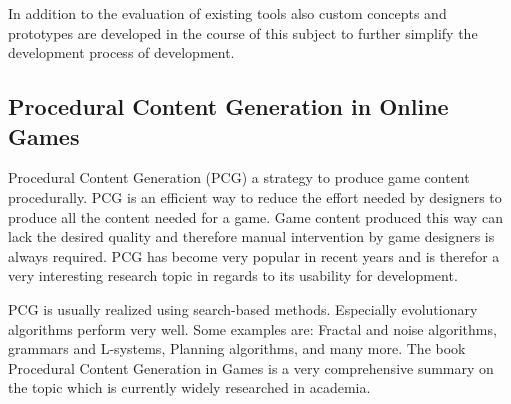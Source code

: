 In addition to the evaluation of existing tools also custom concepts and
prototypes are developed in the course of this subject to further simplify the
development process of \ms{} \og{} development.

\subsection{Procedural Content Generation in Online Games}

Procedural Content Generation (PCG) a strategy to produce game content
procedurally. PCG is an efficient way to reduce the effort needed by designers
to produce all the content needed for a game. Game content produced this way can
lack the desired quality and therefore manual intervention by game designers is
always required. PCG has become very popular in recent years
\cite{lee2014procedural} and is therefor a very interesting research topic in
regards to its usability for \og{} development.

PCG is usually realized using search-based methods. Especially evolutionary
algorithms perform very well. Some examples are: Fractal and noise algorithms,
grammars and L-systems, Planning algorithms, and many more. The book Procedural
Content Generation in Games \cite{shaker2014procedural} is a very comprehensive
summary on the topic which is currently widely researched in academia.
